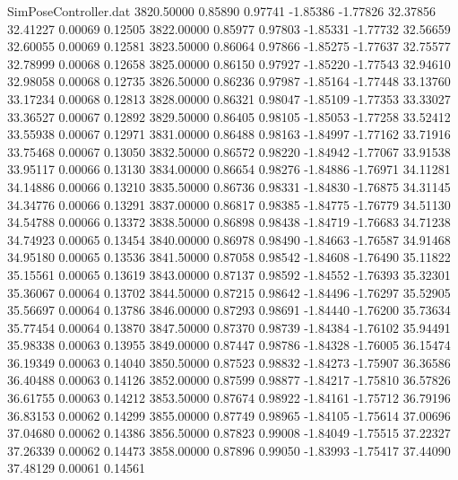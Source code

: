 \begin{filecontents}{SimPoseController.dat}
3820.50000    0.85890    0.97741    -1.85386   -1.77826   32.37856   32.41227    0.00069    0.12505
3822.00000    0.85977    0.97803    -1.85331   -1.77732   32.56659   32.60055    0.00069    0.12581
3823.50000    0.86064    0.97866    -1.85275   -1.77637   32.75577   32.78999    0.00068    0.12658
3825.00000    0.86150    0.97927    -1.85220   -1.77543   32.94610   32.98058    0.00068    0.12735
3826.50000    0.86236    0.97987    -1.85164   -1.77448   33.13760   33.17234    0.00068    0.12813
3828.00000    0.86321    0.98047    -1.85109   -1.77353   33.33027   33.36527    0.00067    0.12892
3829.50000    0.86405    0.98105    -1.85053   -1.77258   33.52412   33.55938    0.00067    0.12971
3831.00000    0.86488    0.98163    -1.84997   -1.77162   33.71916   33.75468    0.00067    0.13050
3832.50000    0.86572    0.98220    -1.84942   -1.77067   33.91538   33.95117    0.00066    0.13130
3834.00000    0.86654    0.98276    -1.84886   -1.76971   34.11281   34.14886    0.00066    0.13210
3835.50000    0.86736    0.98331    -1.84830   -1.76875   34.31145   34.34776    0.00066    0.13291
3837.00000    0.86817    0.98385    -1.84775   -1.76779   34.51130   34.54788    0.00066    0.13372
3838.50000    0.86898    0.98438    -1.84719   -1.76683   34.71238   34.74923    0.00065    0.13454
3840.00000    0.86978    0.98490    -1.84663   -1.76587   34.91468   34.95180    0.00065    0.13536
3841.50000    0.87058    0.98542    -1.84608   -1.76490   35.11822   35.15561    0.00065    0.13619
3843.00000    0.87137    0.98592    -1.84552   -1.76393   35.32301   35.36067    0.00064    0.13702
3844.50000    0.87215    0.98642    -1.84496   -1.76297   35.52905   35.56697    0.00064    0.13786
3846.00000    0.87293    0.98691    -1.84440   -1.76200   35.73634   35.77454    0.00064    0.13870
3847.50000    0.87370    0.98739    -1.84384   -1.76102   35.94491   35.98338    0.00063    0.13955
3849.00000    0.87447    0.98786    -1.84328   -1.76005   36.15474   36.19349    0.00063    0.14040
3850.50000    0.87523    0.98832    -1.84273   -1.75907   36.36586   36.40488    0.00063    0.14126
3852.00000    0.87599    0.98877    -1.84217   -1.75810   36.57826   36.61755    0.00063    0.14212
3853.50000    0.87674    0.98922    -1.84161   -1.75712   36.79196   36.83153    0.00062    0.14299
3855.00000    0.87749    0.98965    -1.84105   -1.75614   37.00696   37.04680    0.00062    0.14386
3856.50000    0.87823    0.99008    -1.84049   -1.75515   37.22327   37.26339    0.00062    0.14473
3858.00000    0.87896    0.99050    -1.83993   -1.75417   37.44090   37.48129    0.00061    0.14561

\end{filecontents}
